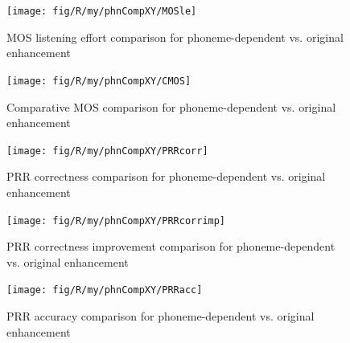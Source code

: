 \begin{figure}[h]
\noindent \begin{centering}
\texttt{[image: fig/R/my/phnCompXY/MOSle]}
\par\end{centering}

\protect\caption{\label{fig:mosle-comparison-phn}\acs{MOS} listening effort comparison
for phoneme-dependent vs. original enhancement}
\end{figure}


\begin{figure}[h]
\noindent \begin{centering}
\texttt{[image: fig/R/my/phnCompXY/CMOS]}
\par\end{centering}

\protect\caption{\label{fig:cmos-comparison-phn}Comparative \foreignlanguage{australian}{\acs{MOS}
comparison for phoneme-dependent vs. original enhancement}%
}
\end{figure}


\begin{figure}[h]
\noindent \begin{centering}
\texttt{[image: fig/R/my/phnCompXY/PRRcorr]}
\par\end{centering}

\protect\caption{\label{fig:prrcorr-comparison-phn}\foreignlanguage{australian}{\acs{PRR}
correctness comparison for phoneme-dependent vs. original enhancement}%
}
\end{figure}


\begin{figure}[h]
\noindent \begin{centering}
\texttt{[image: fig/R/my/phnCompXY/PRRcorrimp]}
\par\end{centering}

\protect\caption{\label{fig:prrcorrimp-comparison-phn}\acs{PRR} correctness improvement
comparison for phoneme-dependent vs. original enhancement}
\end{figure}


\begin{figure}[h]
\noindent \begin{centering}
\texttt{[image: fig/R/my/phnCompXY/PRRacc]}
\par\end{centering}

\protect\caption{\label{fig:prracc-comparison-phn}\foreignlanguage{australian}{\acs{PRR}
accuracy comparison for phoneme-dependent vs. original enhancement}%
}
\end{figure}


